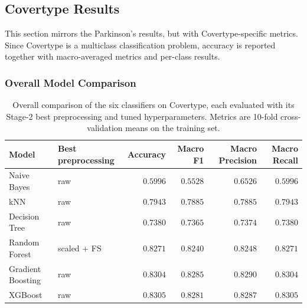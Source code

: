 \documentclass[11pt,a4paper]{article}
\begin{document}
\subsection{Covertype Results}

This section mirrors the Parkinson's results, but with Covertype-specific
metrics. Since Covertype is a multiclass classification problem, accuracy is
reported together with macro-averaged metrics and per-class results.

\subsubsection{Overall Model Comparison}

\begin{table}[H]
    \centering
    \caption{Overall comparison of the six classifiers on Covertype, each
    evaluated with its Stage-2 best preprocessing and tuned hyperparameters.
    Metrics are 10-fold cross-validation means on the training set.}
    \label{tab:ct_overall}
    \begin{tabular}{llrrrr}
        \toprule
        Model & Best preprocessing & Accuracy & Macro F1 & Macro Precision & Macro Recall \\
        \midrule
        Naive Bayes        & raw                  & $0.5996$ & $0.5528$ & $0.6526$ & $0.5996$ \\
        kNN                & raw                  & $0.7943$ & $0.7885$ & $0.7885$ & $0.7943$ \\
        Decision Tree      & raw                  & $0.7380$ & $0.7365$ & $0.7374$ & $0.7380$ \\
        Random Forest      & scaled + FS          & $0.8271$ & $0.8240$ & $0.8248$ & $0.8271$ \\
        Gradient Boosting  & raw                  & $0.8304$ & $0.8285$ & $0.8290$ & $0.8304$ \\
        XGBoost            & raw                  & $0.8305$ & $0.8281$ & $0.8287$ & $0.8305$ \\
        \bottomrule
    \end{tabular}
\end{table}
\end{document}
